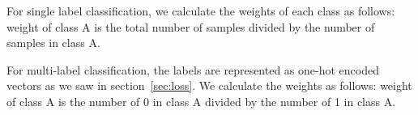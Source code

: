 For single label classification, we calculate the weights of each class as follows: weight of class A is the total number of samples divided by the number of samples in class A.

For multi-label classification, the labels are represented as one-hot encoded vectors as we saw in section~\ref{sec:loss}. We calculate the weights as follows: weight of class A is the number of 0 in class A divided by the number of 1 in class A.

\begin{figure}
\end{figure}
